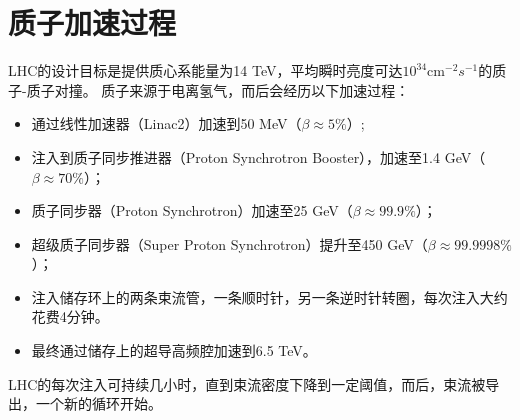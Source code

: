 \section{质子加速过程}
LHC的设计目标是提供质心系能量为14 TeV，平均瞬时亮度可达$10^{34} \text{cm}^{-2}s^{-1}$的质子-质子对撞。
质子来源于电离氢气，而后会经历以下加速过程：
\begin{itemize}
  \item 通过线性加速器（Linac2）加速到50 MeV（$\beta\approx5\%$）;
  \item 注入到质子同步推进器（Proton Synchrotron Booster），加速至1.4 GeV（$\beta\approx70\%$）；
  \item 质子同步器（Proton Synchrotron）加速至25 GeV（$\beta\approx99.9\%$）；
  \item 超级质子同步器（Super Proton Synchrotron）提升至450 GeV（$\beta\approx99.9998\%$）；
  \item 注入储存环上的两条束流管，一条顺时针，另一条逆时针转圈，每次注入大约花费4分钟。
  \item 最终通过储存上的超导高频腔加速到6.5 TeV。
\end{itemize}
LHC的每次注入可持续几小时，直到束流密度下降到一定阈值，而后，束流被导出，一个新的循环开始。

